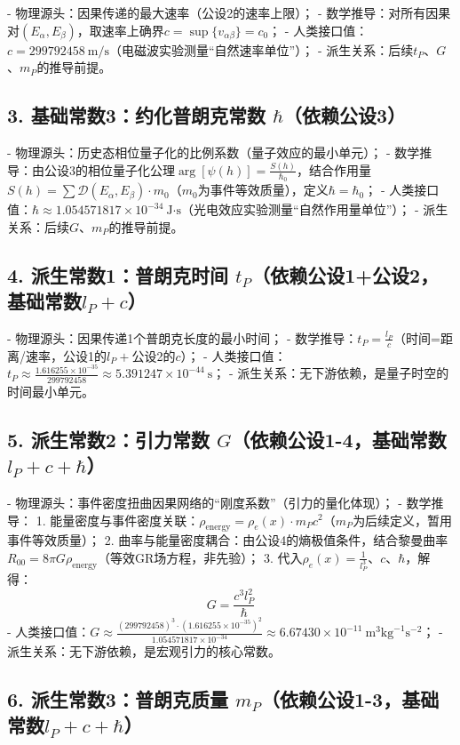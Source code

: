 \documentclass{article}
\begin{document}
- 物理源头：因果传递的最大速率（公设2的速率上限）；
- 数学推导：对所有因果对$(E_\alpha,E_\beta)$，取速率上确界$c = \sup\{v_{\alpha\beta}\} = c_0$；
- 人类接口值：$c = 299792458\ \text{m/s}$（电磁波实验测量“自然速率单位”）；
- 派生关系：后续$t_P$、$G$、$m_P$的推导前提。

\subsection*{3. 基础常数3：约化普朗克常数 $\hbar$（依赖公设3）}

- 物理源头：历史态相位量子化的比例系数（量子效应的最小单元）；
- 数学推导：由公设3的相位量子化公理$\arg[\psi(h)] = \frac{S(h)}{\hbar_0}$，结合作用量$S(h)=\sum \mathcal{D}(E_\alpha,E_\beta) \cdot m_0$（$m_0$为事件等效质量），定义$\hbar = \hbar_0$；
- 人类接口值：$\hbar \approx 1.054571817 \times 10^{-34}\ \text{J·s}$（光电效应实验测量“自然作用量单位”）；
- 派生关系：后续$G$、$m_P$的推导前提。

\subsection*{4. 派生常数1：普朗克时间 $t_P$（依赖公设1+公设2，基础常数$l_P+c$）}

- 物理源头：因果传递1个普朗克长度的最小时间；
- 数学推导：$t_P = \frac{l_P}{c}$（时间=距离/速率，公设1的$l_P+$公设2的$c$）；
- 人类接口值：$t_P \approx \frac{1.616255 \times 10^{-35}}{299792458} \approx 5.391247 \times 10^{-44}\ \text{s}$；
- 派生关系：无下游依赖，是量子时空的时间最小单元。

\subsection*{5. 派生常数2：引力常数 $G$（依赖公设1-4，基础常数$l_P+c+\hbar$）}

- 物理源头：事件密度扭曲因果网络的“刚度系数”（引力的量化体现）；
- 数学推导：
  1. 能量密度与事件密度关联：$\rho_{\text{energy}} = \rho_e(x) \cdot m_P c^2$（$m_P$为后续定义，暂用事件等效质量）；
  2. 曲率与能量密度耦合：由公设4的熵极值条件，结合黎曼曲率$R_{00}=8\pi G \rho_{\text{energy}}$（等效GR场方程，非先验）；
  3. 代入$\rho_e(x)=\frac{1}{l_P^3}$、$c$、$\hbar$，解得：
\[
G = \frac{c^3 l_P^2}{\hbar}
\]
- 人类接口值：$G \approx \frac{(299792458)^3 \cdot (1.616255 \times 10^{-35})^2}{1.054571817 \times 10^{-34}} \approx 6.67430 \times 10^{-11}\ \text{m}^3\text{kg}^{-1}\text{s}^{-2}$；
- 派生关系：无下游依赖，是宏观引力的核心常数。

\subsection*{6. 派生常数3：普朗克质量 $m_P$（依赖公设1-3，基础常数$l_P+c+\hbar$）}
\end{document}
